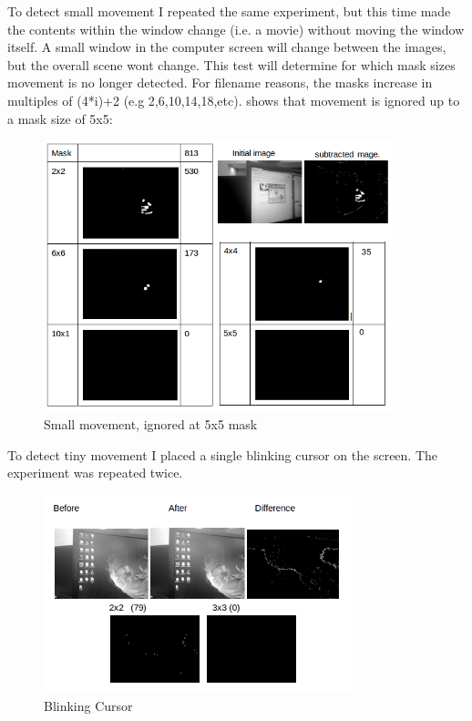 \documentclass[11pt]{article} %
\begin{document}
To detect small movement I repeated the same experiment, but this time made the contents within the window change (i.e. a movie) without moving the window itself.  A small window in the computer screen will change between the images, but the overall scene wont change. This test will determine for which mask sizes movement is no longer detected.
For filename reasons, the masks increase in multiples of (4*i)+2  (e.g 2,6,10,14,18,etc).  shows that movement is ignored up to a mask size of 5x5:
\begin{figure}[H]
	\vspace{30pt}
	\begin{center}
		\includegraphics[width=0.9\textwidth]{../images/ImageOps/SMALL}
	\end{center}
	\vspace{10pt}
	\caption{Small  movement, ignored at 5x5 mask}	
	\label{img:small}
	\vspace{20pt}
\end{figure}
\pagebreak
To  detect tiny movement I placed a single blinking cursor on the screen. The experiment was repeated twice.
\begin{figure}[H]
	\vspace{-10pt}
	\begin{center}
		\includegraphics[width=0.8\textwidth]{../images/ImageOps/CURSOR1}
	\end{center}
	\vspace{-20pt}
	\caption{Blinking Cursor}
	\label{img:curse1}
\end{figure}
\end{document}

